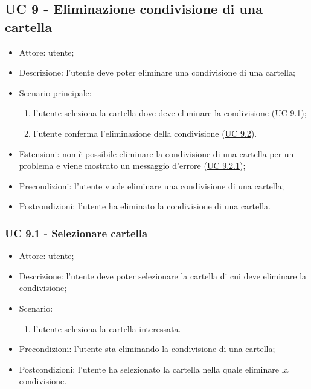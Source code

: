     \subsection{UC 9 - Eliminazione condivisione di una cartella}
    \begin{itemize}
        \item Attore: utente;
        \item Descrizione: l'utente deve poter eliminare una condivisione di una cartella;
        \item Scenario principale:
            \begin{enumerate}
            \item l'utente seleziona la cartella dove deve eliminare la condivisione (\hyperref[sec: UC 9.1]{UC 9.1});
            \item l'utente conferma l'eliminazione della condivisione (\hyperref[sec: UC 9.2]{UC 9.2}).
            \end{enumerate}
        \item Estensioni: non è possibile eliminare la condivisione di una cartella per un problema e viene mostrato un messaggio d'errore (\hyperref[sec: UC 9.2.1]{UC 9.2.1});
        \item Precondizioni: l'utente vuole eliminare una condivisione di una cartella;
        \item Postcondizioni: l'utente ha eliminato la condivisione di una cartella.
    \end{itemize}
    \subsubsection{UC 9.1 - Selezionare cartella} \label{sec: UC 9.1}
    \begin{itemize}
        \item Attore: utente;
        \item Descrizione: l'utente deve poter selezionare la cartella di cui deve eliminare la condivisione;
        \item Scenario:
        \begin{enumerate}
        \item l'utente seleziona la cartella interessata.
        \end{enumerate}
        \item Precondizioni: l'utente sta eliminando la condivisione di una cartella;
        \item Postcondizioni: l'utente ha selezionato la cartella nella quale eliminare la condivisione.
    \end{itemize}

